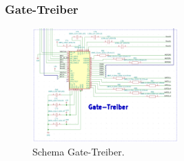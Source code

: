 \clearpage
\subsubsection{Gate-Treiber}
\label{subsubsec:Gate-Treiber}

\begin{figure}[h!]
	\centering
	\includegraphics[width=0.5\textwidth]{graphics/Schema_Gate_Treiber}
	\caption{Schema Gate-Treiber.}
	\label{fig:Schema_Gate_Treiber}
\end{figure}

